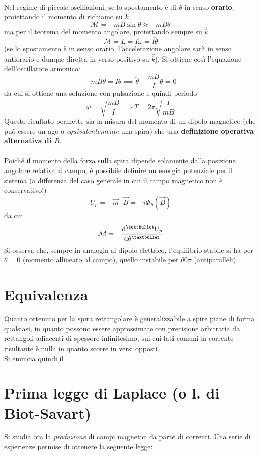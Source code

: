 \\Nel regime di piccole oscillazioni, se lo spostamento è di $\theta$ in senso \textbf{orario}, proiettando il momento di richiamo su $\hat{k}$
\[\mathcal{M} = - m B \sin \theta \approx - m B \theta\]
ma per il teorema del momento angolare, proiettando sempre su $\hat{k}$
\[\mathcal{M} = \dot L = I \dot \omega = I \ddot \theta\]
(se lo spostamento è in senso orario, l'accelerazione angolare sarà in senso antiorario e dunque diretta in verso positivo su $\hat{k}$). Si ottiene così l'equazione dell'oscillatore armonico:
\[- m B \theta = I \ddot \theta \implies \ddot \theta + \frac{mB}{I} \theta = 0\]
da cui si ottiene una soluzione con pulsazione e quindi periodo
\[\omega = \sqrt{\frac{mB}{I}} \implies T = 2 \pi \sqrt{\frac{I}{mB}}\]
Questo risultato permette sia la misura del momento di un dipolo magnetico (che può essere un ago o \textit{equivalentemente} una spira) che una \textbf{definizione operativa alternativa di $B$}.
\\~\\
Poiché il momento della forza sulla spira dipende solamente dalla posizione angolare relativa al campo, è possibile definire un energia potenziale per il sistema (a differenza del caso generale in cui il campo magnetico non è conservativo!)
\[U_p = - \vec{m} \cdot \vec{B} = - i \Phi_S(\vec{B})\]
da cui
\[\mathcal{M} = - \dv[•]{U_p}{\theta}\]
Si osserva che, sempre in analogia al dipolo elettrico, l'equilibrio stabile si ha per $\theta = 0$ (momento allineato al campo), quello instabile per $\theta 0 \pi$ (antiparalleli).

\section{Equivalenza}
Quanto ottenuto per la spira rettangolare è generalizzabile a spire piane di forma qualsiasi, in quanto possono essere approssimate con precisione arbitraria da rettangoli adiacenti di spessore infinitesimo, sui cui lati comuni la corrente risultante è nulla in quanto scorre in versi opposti.
\\Si enuncia quindi il

\section{Prima legge di Laplace (o l. di Biot-Savart)}
Si studia ora la \textit{produzione} di campi magnetici da parte di correnti. Una serie di esperienze permise di ottenere la seguente legge:

